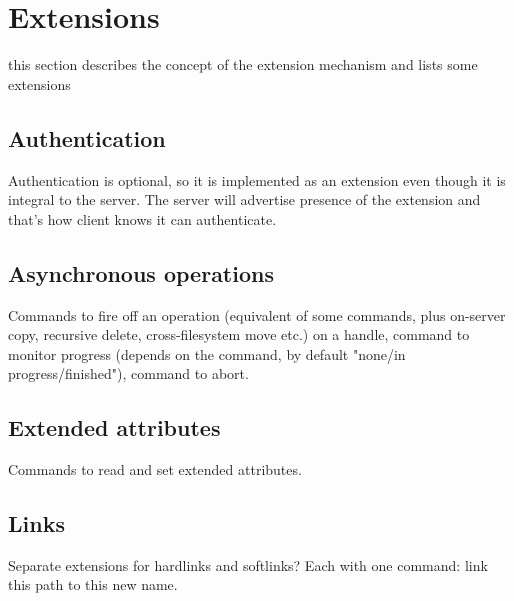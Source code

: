 \section{Extensions}

this section describes the concept of the extension mechanism and lists some extensions

\subsection{Authentication}

Authentication is optional, so it is implemented as an extension even though it is integral to the server. The
server will advertise presence of the extension and that's how client knows it can authenticate.

\subsection{Asynchronous operations}

Commands to fire off an operation (equivalent of some commands, plus on-server copy, recursive delete,
cross-filesystem move etc.) on a handle, command to monitor progress (depends on the command, by default
"none/in progress/finished"), command to abort.

\subsection{Extended attributes}

Commands to read and set extended attributes.

\subsection{Links}

Separate extensions for hardlinks and softlinks? Each with one command: link this path to this new name.
